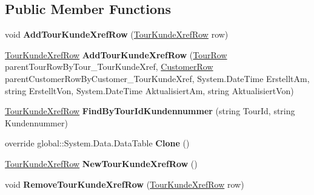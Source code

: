 \subsection*{Public Member Functions}
\begin{DoxyCompactItemize}
\item 
void {\bfseries Add\+Tour\+Kunde\+Xref\+Row} (\hyperlink{class_products_1_1_data_1_1ds_sage_1_1_tour_kunde_xref_row}{Tour\+Kunde\+Xref\+Row} row)\hypertarget{class_products_1_1_data_1_1ds_sage_1_1_tour_kunde_xref_data_table_a48ce89cb84e3cfcf9471207eb4c6539a}{}\label{class_products_1_1_data_1_1ds_sage_1_1_tour_kunde_xref_data_table_a48ce89cb84e3cfcf9471207eb4c6539a}

\item 
\hyperlink{class_products_1_1_data_1_1ds_sage_1_1_tour_kunde_xref_row}{Tour\+Kunde\+Xref\+Row} {\bfseries Add\+Tour\+Kunde\+Xref\+Row} (\hyperlink{class_products_1_1_data_1_1ds_sage_1_1_tour_row}{Tour\+Row} parent\+Tour\+Row\+By\+Tour\+\_\+\+Tour\+Kunde\+Xref, \hyperlink{class_products_1_1_data_1_1ds_sage_1_1_customer_row}{Customer\+Row} parent\+Customer\+Row\+By\+Customer\+\_\+\+Tour\+Kunde\+Xref, System.\+Date\+Time Erstellt\+Am, string Erstellt\+Von, System.\+Date\+Time Aktualisiert\+Am, string Aktualisiert\+Von)\hypertarget{class_products_1_1_data_1_1ds_sage_1_1_tour_kunde_xref_data_table_a2b0b564b64d726a35cd7c6f05c0f7ad9}{}\label{class_products_1_1_data_1_1ds_sage_1_1_tour_kunde_xref_data_table_a2b0b564b64d726a35cd7c6f05c0f7ad9}

\item 
\hyperlink{class_products_1_1_data_1_1ds_sage_1_1_tour_kunde_xref_row}{Tour\+Kunde\+Xref\+Row} {\bfseries Find\+By\+Tour\+Id\+Kundennummer} (string Tour\+Id, string Kundennummer)\hypertarget{class_products_1_1_data_1_1ds_sage_1_1_tour_kunde_xref_data_table_acbc03fe1caa996779e736fe48bf58056}{}\label{class_products_1_1_data_1_1ds_sage_1_1_tour_kunde_xref_data_table_acbc03fe1caa996779e736fe48bf58056}

\item 
override global\+::\+System.\+Data.\+Data\+Table {\bfseries Clone} ()\hypertarget{class_products_1_1_data_1_1ds_sage_1_1_tour_kunde_xref_data_table_a65a80c9286582e05bd830ed44b469a56}{}\label{class_products_1_1_data_1_1ds_sage_1_1_tour_kunde_xref_data_table_a65a80c9286582e05bd830ed44b469a56}

\item 
\hyperlink{class_products_1_1_data_1_1ds_sage_1_1_tour_kunde_xref_row}{Tour\+Kunde\+Xref\+Row} {\bfseries New\+Tour\+Kunde\+Xref\+Row} ()\hypertarget{class_products_1_1_data_1_1ds_sage_1_1_tour_kunde_xref_data_table_acd87589830da559d4fa929c18deb7e23}{}\label{class_products_1_1_data_1_1ds_sage_1_1_tour_kunde_xref_data_table_acd87589830da559d4fa929c18deb7e23}

\item 
void {\bfseries Remove\+Tour\+Kunde\+Xref\+Row} (\hyperlink{class_products_1_1_data_1_1ds_sage_1_1_tour_kunde_xref_row}{Tour\+Kunde\+Xref\+Row} row)\hypertarget{class_products_1_1_data_1_1ds_sage_1_1_tour_kunde_xref_data_table_aa90d6e1f09562328e6027c8adb23e319}{}\label{class_products_1_1_data_1_1ds_sage_1_1_tour_kunde_xref_data_table_aa90d6e1f09562328e6027c8adb23e319}

\end{DoxyCompactItemize}
